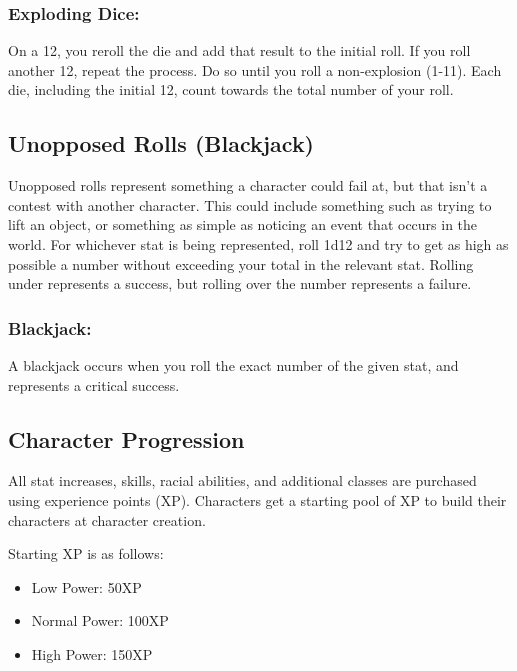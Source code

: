 \begin{multicols}{2}
\subsubsection{Exploding Dice:}
On a 12, you reroll the die and add that result to the initial roll. If you roll another 12, repeat the process. Do so until you roll a non-explosion (1-11). Each die, including the initial 12, count towards the total number of your roll.

\subsection{Unopposed Rolls (Blackjack)}
Unopposed rolls represent something a character could fail at, but that isn’t a contest with another character.  This could include something such as trying to lift an object, or something as simple as noticing an event that occurs in the world. For whichever stat is being represented, roll 1d12 and try to get as high as possible a number without exceeding your total in the relevant stat. Rolling under represents a success, but rolling over the number represents a failure.

\subsubsection{Blackjack: }
A blackjack occurs when you roll the exact number of the given stat, and represents a critical success. 

\subsection{Character Progression}
All stat increases, skills, racial abilities, and additional classes are purchased using experience points (XP). Characters get a starting pool of XP to build their characters at character creation.

\noindent Starting XP is as follows:
\begin{itemize}
\item Low Power: 50XP
\item Normal Power: 100XP
\item High Power: 150XP
\end{itemize}




\end{multicols}
